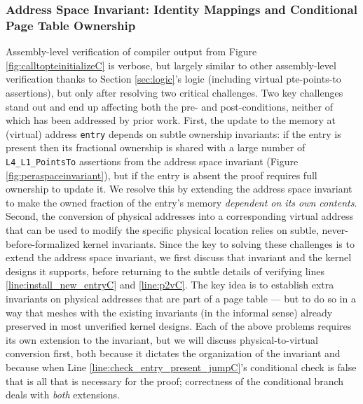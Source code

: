 \subsubsection{Address Space Invariant: Identity Mappings and Conditional Page Table Ownership}
\label{subsec:identitymappingsC}
Assembly-level verification of compiler output from Figure \ref{fig:calltopteinitializeC} is verbose, but largely
similar to other assembly-level verification thanks to Section \ref{sec:logic}'s logic (including virtual pte-points-to
assertions),
but only after resolving two critical challenges.
Two key challenges stand out and end up affecting both the pre- and post-conditions, neither of which has been addressed by prior work.
First, the update to the memory at (virtual) address \lstinline|entry| depends on subtle ownership invariants:
if the entry is present then its fractional ownership is shared with a large number of \lstinline|L4_L1_PointsTo| assertions
from the address space invariant (Figure \ref{fig:peraspaceinvariant}),
but if the entry is absent the proof requires full ownership to update it. We resolve this by extending the address space invariant
to make the owned fraction of the entry's memory \emph{dependent on its own contents}.
Second, the conversion of physical addresses into a corresponding virtual address that can be used to modify the specific
physical location relies on subtle, never-before-formalized kernel invariants.
%
Since the key to solving these challenges is to extend the address space invariant, we
first discuss that invariant and the kernel designs it supports, before returning to the subtle details of
verifying lines \ref{line:install_new_entryC} and \ref{line:p2vC}.
The key idea is to establish extra invariants on physical addresses that are part of a page table ---
but to do so in a way that meshes with the existing invariants (in the informal sense) already preserved in most
unverified kernel designs.
Each of the above problems requires its own extension to the invariant, but we will discuss
physical-to-virtual conversion first, both because it dictates the organization of the invariant
and because when Line \ref{line:check_entry_present_jumpC}'s
conditional check is false that is all that is necessary for the proof; correctness of the conditional branch deals with \emph{both}
extensions.

